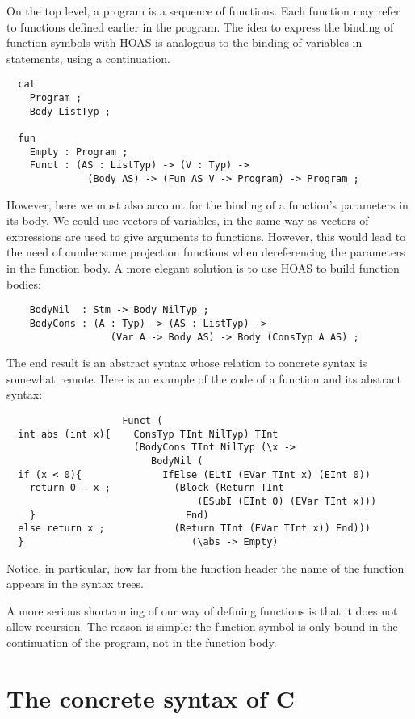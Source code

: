 \documentclass[12pt]{article}
\begin{document}
On the top level, a program is a sequence of functions.
Each function may refer to functions defined earlier
in the program. The idea to express the binding of
function symbols with HOAS is analogous to the binding
of variables in statements, using a continuation.
\begin{verbatim}
  cat
    Program ;
    Body ListTyp ;

  fun
    Empty : Program ;
    Funct : (AS : ListTyp) -> (V : Typ) -> 
              (Body AS) -> (Fun AS V -> Program) -> Program ;
\end{verbatim}
However, here we must also account for the binding of
a function's parameters in its body. We could use
vectors of variables, in the same way as vectors of
expressions are used to give arguments to functions.
However, this would lead to the need of cumbersome
projection functions when dereferencing the parameters
in the function body. A more elegant solution is
to use HOAS to build function bodies:
\begin{verbatim}
    BodyNil  : Stm -> Body NilTyp ;
    BodyCons : (A : Typ) -> (AS : ListTyp) -> 
                  (Var A -> Body AS) -> Body (ConsTyp A AS) ;
\end{verbatim}
The end result is an abstract syntax whose relation
to concrete syntax is somewhat remote. Here is an example of
the code of a function and its abstract syntax:
\begin{verbatim}
                    Funct (
  int abs (int x){    ConsTyp TInt NilTyp) TInt 
                      (BodyCons TInt NilTyp (\x -> 
                         BodyNil (
  if (x < 0){              IfElse (ELtI (EVar TInt x) (EInt 0))
    return 0 - x ;           (Block (Return TInt 
                                 (ESubI (EInt 0) (EVar TInt x))) 
    }                          End) 
  else return x ;            (Return TInt (EVar TInt x)) End))) 
  }                             (\abs -> Empty)
\end{verbatim}
Notice, in particular, how far from the function header the
name of the function appears in the syntax trees.

A more serious shortcoming of our way of defining functions 
is that it does not allow recursion. The reason is simple:
the function symbol is only bound in the continuation
of the program, not in the function body.


\section{The concrete syntax of C}
\end{document}
